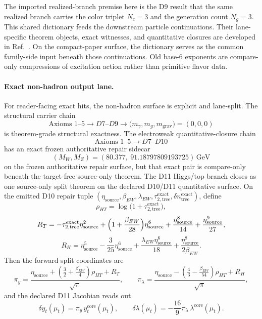 \documentclass[11pt]{article}
\begin{document}
The imported realized-branch premise here is the D9 result that the same realized branch carries the color triplet \(N_c=3\) and the generation count \(N_g=3\).
This shared dictionary feeds the downstream particle continuations. Their lane-specific theorem
objects, exact witnesses, and quantitative closures are developed in
Ref.~\cite{ophparticles}. On the compact-paper surface, the dictionary serves as the common
family-side input beneath those continuations. Old base-6 exponents are compare-only
compressions of excitation action rather than primitive flavor data.

\paragraph{Exact non-hadron output lane.}
For reader-facing exact hits, the non-hadron surface is explicit and lane-split. The structural carrier chain
\[
\text{Axioms }1\text{--}5 \longrightarrow D7\text{--}D9 \longrightarrow
\bigl(m_\gamma,m_g,m_{\mathrm{grav}}\bigr)=(0,0,0)
\]
is theorem-grade structural exactness. The electroweak quantitative-closure chain
\[
\text{Axioms }1\text{--}5 \longrightarrow D7\text{--}D10
\]
has an exact frozen authoritative repair sidecar
\[
(M_W,M_Z)=
(80.377,\ 91.18797809193725)\,\mathrm{GeV}
\]
on the frozen authoritative repair surface, but that exact pair is compare-only beneath the target-free source-only theorem. The D11 Higgs/top branch closes as one source-only split theorem on the declared D10/D11 quantitative surface. On the emitted D10 repair tuple \((\eta_{\mathrm{source}},\beta_{EW},\lambda_{EW},\tau_{2,\mathrm{tree}}^{\mathrm{exact}},\delta n_{\mathrm{tree}}^{\mathrm{exact}})\), define
\[
\rho_{HT}=\log\!\bigl(1+\tau_{2,\mathrm{tree}}^{\mathrm{exact}}\bigr),
\]
\[
R_T=
-\tau_{2,\mathrm{tree}}^{\mathrm{exact}}\eta_{\mathrm{source}}^2
+\Bigl(1+\frac{\beta_{EW}}{28}\Bigr)\eta_{\mathrm{source}}^6
+\frac{\eta_{\mathrm{source}}^8}{14}
+\frac{\eta_{\mathrm{source}}^9}{27},
\]
\[
R_H=
\eta_{\mathrm{source}}^5
-\frac{3}{25}\eta_{\mathrm{source}}^6
+\frac{\lambda_{EW}\eta_{\mathrm{source}}^6}{18}
+\frac{\eta_{\mathrm{source}}^8}{2\beta_{EW}}.
\]
Then the forward split coordinates are
\[
\pi_y=
\frac{\eta_{\mathrm{source}}+\left(\frac32+\frac{\beta_{EW}}4\right)\rho_{HT}+R_T}{\sqrt{\pi}},
\qquad
\pi_\lambda=
\frac{\eta_{\mathrm{source}}-\left(\frac43-\frac{\beta_{EW}}{54}\right)\rho_{HT}+R_H}{\sqrt{\pi}},
\]
and the declared D11 Jacobian reads out
\[
\delta y_t(\mu_t)=\pi_y\,y_t^{\mathrm{core}}(\mu_t),
\qquad
\delta\lambda(\mu_t)=-\frac{16}{9}\pi_\lambda\,\lambda^{\mathrm{core}}(\mu_t).
\]
\end{document}
